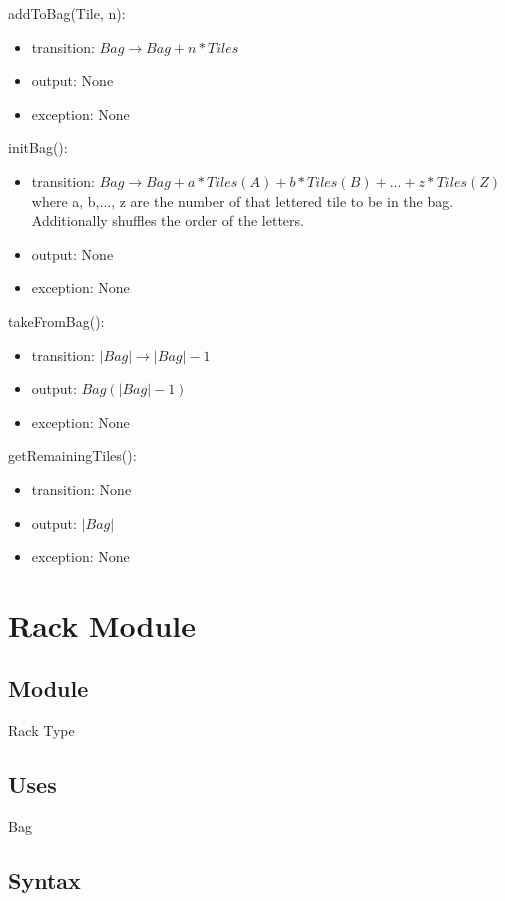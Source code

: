 \documentclass[12pt]{article}
\begin{document}
\noindent addToBag(Tile, n):
\begin{itemize}
\item transition: $Bag \rightarrow Bag+n*Tiles$
\item output: None
\item exception: None
\end{itemize}

\noindent initBag():
\begin{itemize}
\item transition: $Bag \rightarrow Bag+a*Tiles(A)+b*Tiles(B)+...+z*Tiles(Z)$\\
where a, b,..., z are the number of that lettered tile to be in the bag.\\ Additionally shuffles the order of the letters.
\item output: None
\item exception: None
\end{itemize}

\noindent takeFromBag():
\begin{itemize}
\item transition: $|Bag| \rightarrow |Bag|-1$
\item output: $Bag(|Bag|-1)$
\item exception: None
\end{itemize}

\noindent getRemainingTiles():
\begin{itemize}
\item transition: None
\item output: $|Bag|$
\item exception: None
\end{itemize}

\newpage

\section* {Rack Module}

\subsection*{Module}

Rack Type

\subsection* {Uses}

Bag

\subsection* {Syntax}
\end{document}
